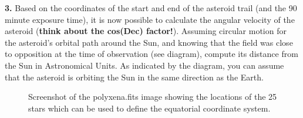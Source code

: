 {\bf 3.} Based on the coordinates of the start and end of the asteroid trail (and the 90 minute 
exposure time), it is now possible to calculate the angular velocity of the asteroid
({\bf think about the cos(Dec) factor!}). Assuming
circular motion for the asteroid's orbital path around the Sun, and
knowing that the field was close to opposition at the time of
observation (see diagram), compute its distance from the Sun in Astronomical Units. 
As indicated by the diagram, you can assume that
the asteroid is orbiting the Sun in the same direction as the Earth.
\begin{figure}
\centerline{}
\caption{Screenshot of the polyxena.fits image showing the locations of the 25 stars which can be used to
define the equatorial coordinate system.}
\end{figure}

\newpage
\vspace*{1cm}


\begin{center}
\centerline{}
\end{center}

